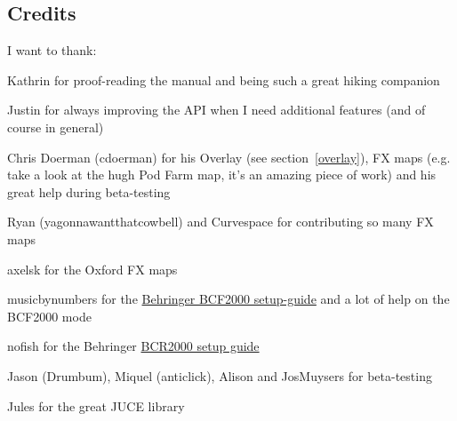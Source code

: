 \subsection{Credits}
I want to thank:
\begin{compactitem}
\item Kathrin for proof-reading the manual and being such a great
  hiking companion
\item Justin for always improving the \reaper API when I need
  additional features (and of course \reaper in general)
\item Chris Doerman (cdoerman) for his Overlay (see
  section~\ref{overlay}), FX maps (e.g. take a look at the hugh Pod
  Farm map, it's an amazing piece of work) and his great help during
  beta-testing
\item Ryan (yagonnawantthatcowbell) and Curvespace for contributing so
  many FX maps
\item axelsk for the Oxford FX maps
\item musicbynumbers for the
  \href{http://forum.cockos.com/showpost.php?p=473466&postcount=127}{Behringer
    BCF2000 setup-guide} and a lot of help on the BCF2000 mode
\item nofish for the Behringer
  \href{http://forum.cockos.com/showthread.php?t=60110}{BCR2000
    setup guide}
\item Jason (Drumbum), Miquel (anticlick), Alison and JosMuysers for
beta-testing
\item Jules for the great JUCE library
\end{compactitem}

